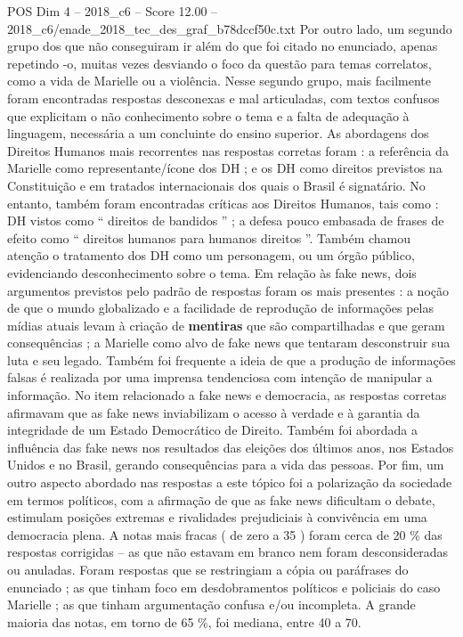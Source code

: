 \begin{textsample}{POS Dim 4 – 2018\_c6 – Score 12.00 – 2018\_c6/enade\_2018\_tec\_des\_graf\_b78dccf50c.txt}
Por outro lado, um segundo grupo dos que não conseguiram ir além do que foi citado no enunciado, apenas repetindo -o, muitas vezes desviando o foco da questão para temas correlatos, como a vida de Marielle ou a violência.
Nesse segundo grupo, mais facilmente foram encontradas respostas desconexas e mal articuladas, com textos confusos que explicitam o não conhecimento sobre o tema e a falta de adequação à linguagem, necessária a um concluinte do ensino superior.
As abordagens dos Direitos Humanos mais recorrentes nas respostas corretas foram : a referência da Marielle como representante/ícone dos DH ; e os DH como direitos previstos na Constituição e em tratados internacionais dos quais o Brasil é signatário.
No entanto, também foram encontradas críticas aos Direitos Humanos, tais como : DH vistos como “ direitos de bandidos ” ; a defesa pouco embasada de frases de efeito como “ direitos humanos para humanos direitos ”.
Também chamou atenção o tratamento dos DH como um personagem, ou um órgão público, evidenciando desconhecimento sobre o tema.
Em relação às fake news, dois argumentos previstos pelo padrão de respostas foram os mais presentes : a noção de que o mundo globalizado e a facilidade de reprodução de informações pelas mídias atuais levam à criação de \textbf{mentiras} que são compartilhadas e que geram consequências ; a Marielle como alvo de fake news que tentaram desconstruir sua luta e seu legado.
Também foi frequente a ideia de que a produção de informações falsas é realizada por uma imprensa tendenciosa com intenção de manipular a informação.
No item relacionado a fake news e democracia, as respostas corretas afirmavam que as fake news inviabilizam o acesso à verdade e à garantia da integridade de um Estado Democrático de Direito.
Também foi abordada a influência das fake news nos resultados das eleições dos últimos anos, nos Estados Unidos e no Brasil, gerando consequências para a vida das pessoas.
Por fim, um outro aspecto abordado nas respostas a este tópico foi a polarização da sociedade em termos políticos, com a afirmação de que as fake news dificultam o debate, estimulam posições extremas e rivalidades prejudiciais à convivência em uma democracia plena.
A notas mais fracas ( de zero a 35 ) foram cerca de 20 \% das respostas corrigidas – as que não estavam em branco nem foram desconsideradas ou anuladas.
Foram respostas que se restringiam a cópia ou paráfrases do enunciado ; as que tinham foco em desdobramentos políticos e policiais do caso Marielle ; as que tinham argumentação confusa e/ou incompleta.
A grande maioria das notas, em torno de 65 \%, foi mediana, entre 40 a 70.

\end{textsample}
